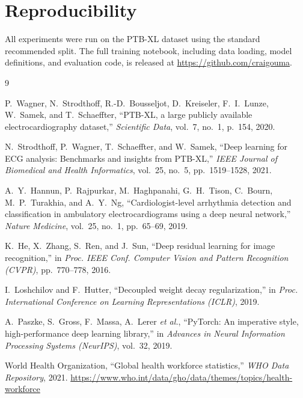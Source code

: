 \documentclass[11pt]{article}
\begin{document}
\section*{Reproducibility}
All experiments were run on the PTB-XL dataset using the standard
recommended split. The full training notebook, including data loading,
model definitions, and evaluation code, is released at
\url{https://github.com/craigouma}.

\begin{thebibliography}{9}

P.~Wagner, N.~Strodthoff, R.-D.~Bousseljot, D.~Kreiseler, F.~I.~Lunze,
W.~Samek, and T.~Schaeffter,
``PTB-XL, a large publicly available electrocardiography dataset,''
\emph{Scientific Data}, vol.~7, no.~1, p.~154, 2020.


N.~Strodthoff, P.~Wagner, T.~Schaeffter, and W.~Samek,
``Deep learning for ECG analysis: Benchmarks and insights from PTB-XL,''
\emph{IEEE Journal of Biomedical and Health Informatics}, vol.~25, no.~5,
pp.~1519--1528, 2021.


A.~Y.~Hannun, P.~Rajpurkar, M.~Haghpanahi, G.~H.~Tison, C.~Bourn,
M.~P.~Turakhia, and A.~Y.~Ng,
``Cardiologist-level arrhythmia detection and classification in ambulatory
electrocardiograms using a deep neural network,''
\emph{Nature Medicine}, vol.~25, no.~1, pp.~65--69, 2019.

K.~He, X.~Zhang, S.~Ren, and J.~Sun,
``Deep residual learning for image recognition,''
in \emph{Proc. IEEE Conf. Computer Vision and Pattern Recognition (CVPR)},
pp.~770--778, 2016.

I.~Loshchilov and F.~Hutter,
``Decoupled weight decay regularization,''
in \emph{Proc. International Conference on Learning Representations (ICLR)},
2019.

A.~Paszke, S.~Gross, F.~Massa, A.~Lerer \emph{et al.},
``PyTorch: An imperative style, high-performance deep learning library,''
in \emph{Advances in Neural Information Processing Systems (NeurIPS)},
vol.~32, 2019.

World Health Organization,
``Global health workforce statistics,''
\emph{WHO Data Repository}, 2021.
\url{https://www.who.int/data/gho/data/themes/topics/health-workforce}

\end{thebibliography}
\end{document}
